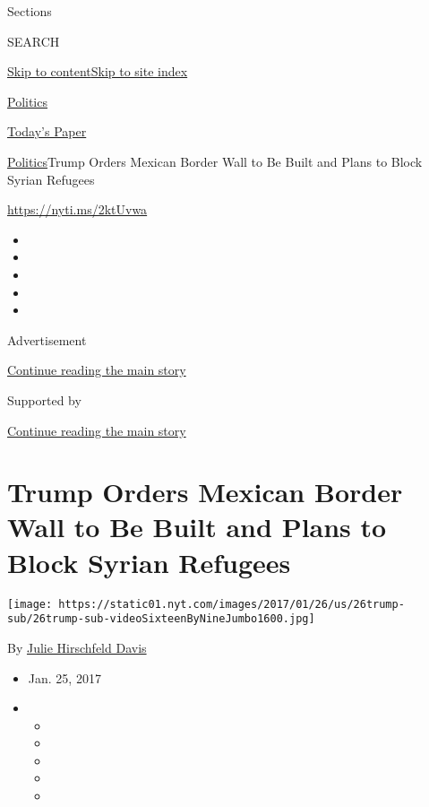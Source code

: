 Sections

SEARCH

\protect\hyperlink{site-content}{Skip to
content}\protect\hyperlink{site-index}{Skip to site index}

\href{https://www.nytimes.com/section/politics}{Politics}

\href{https://myaccount.nytimes.com/auth/login?response_type=cookie\&client_id=vi}{}

\href{https://www.nytimes.com/section/todayspaper}{Today's Paper}

\href{/section/politics}{Politics}\textbar{}Trump Orders Mexican Border
Wall to Be Built and Plans to Block Syrian Refugees

\url{https://nyti.ms/2ktUvwa}

\begin{itemize}
\item
\item
\item
\item
\item
\end{itemize}

Advertisement

\protect\hyperlink{after-top}{Continue reading the main story}

Supported by

\protect\hyperlink{after-sponsor}{Continue reading the main story}

\hypertarget{trump-orders-mexican-border-wall-to-be-built-and-plans-to-block-syrian-refugees}{%
\section{Trump Orders Mexican Border Wall to Be Built and Plans to Block
Syrian
Refugees}\label{trump-orders-mexican-border-wall-to-be-built-and-plans-to-block-syrian-refugees}}

\texttt{[image: https://static01.nyt.com/images/2017/01/26/us/26trump-sub/26trump-sub-videoSixteenByNineJumbo1600.jpg]}

By \href{https://www.nytimes.com/by/julie-hirschfeld-davis}{Julie
Hirschfeld Davis}

\begin{itemize}
\item
  Jan. 25, 2017
\item
  \begin{itemize}
  \item
  \item
  \item
  \item
  \item
  \end{itemize}
\end{itemize}

